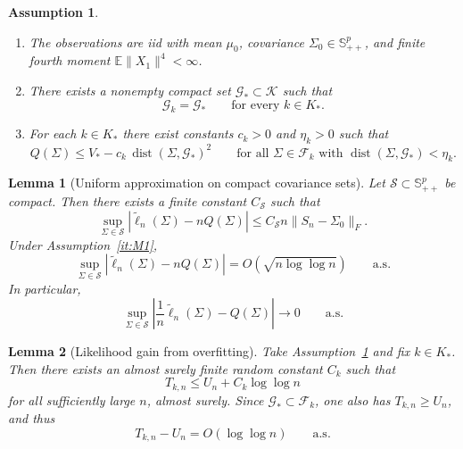 \documentclass[10pt,a4paper]{amsart}
\newtheorem{assumption}{Assumption}
\newtheorem{lemma}{Lemma}
\newcommand{\dist}{\mathop{\mathrm{dist}}}
\begin{document}
\begin{assumption}\label{ass:miss} \leavevmode 
\begin{enumerate}[label=\textnormal(M\arabic*)]
\item \label{it:M1} The observations are iid with mean $\mu_{0}$, covariance
$\Sigma_{0}\in\mathbb{S}_{++}^{p}$, and finite fourth moment $\mathbb{E}\|X_{1}\|^{4}<\infty$. 
\item \label{it:M2} There exists a nonempty compact set $\mathcal{G}_{*}\subset\mathcal{K}$
such that 
\[
\mathcal{G}_{k}=\mathcal{G}_{*}\qquad\text{for every }k\in K_{*}.
\]
\item \label{it:M3} For each $k\in K_{*}$ there exist constants $c_{k}>0$
and $\eta_{k}>0$ such that 
\[
Q(\Sigma)\le V_{*}-c_{k}\,\dist(\Sigma,\mathcal{G}_{*})^{2}\qquad\text{for all }\Sigma\in\mathcal{F}_{k}\text{ with }\dist(\Sigma,\mathcal{G}_{*})<\eta_{k}.
\]
\end{enumerate}
\end{assumption}

\begin{lemma}[Uniform approximation on compact covariance sets]\label{lem:uniform}
Let $\mathcal{S}\subset\mathbb{S}_{++}^{p}$ be compact. Then there
exists a finite constant $C_{\mathcal{S}}$ such that 
\[
\sup_{\Sigma\in\mathcal{S}}\left|\widetilde{\ell}_{n}(\Sigma)-nQ(\Sigma)\right|\le C_{\mathcal{S}}n\|S_{n}-\Sigma_{0}\|_{F}.
\]
Under Assumption~\ref{it:M1}, 
\[
\sup_{\Sigma\in\mathcal{S}}\left|\widetilde{\ell}_{n}(\Sigma)-nQ(\Sigma)\right|=O\left(\sqrt{n\log\log n}\right)\qquad\text{a.s.}
\]
In particular, 
\[
\sup_{\Sigma\in\mathcal{S}}\left|\frac{1}{n}\widetilde{\ell}_{n}(\Sigma)-Q(\Sigma)\right|\to0\qquad\text{a.s.}
\]
\end{lemma}

\begin{lemma}[Likelihood gain from overfitting]\label{lem:exactoverfit}
Take Assumption~\ref{ass:miss} and fix $k\in K_{*}$. Then there
exists an almost surely finite random constant $C_{k}$ such that
\[
T_{k,n}\le U_{n}+C_{k}\log\log n
\]
for all sufficiently large $n$, almost surely. Since $\mathcal{G}_{*}\subset\mathcal{F}_{k}$,
one also has $T_{k,n}\ge U_{n}$, and thus 
\[
T_{k,n}-U_{n}=O(\log\log n)\qquad\text{a.s.}
\]
\end{lemma}
\end{document}
